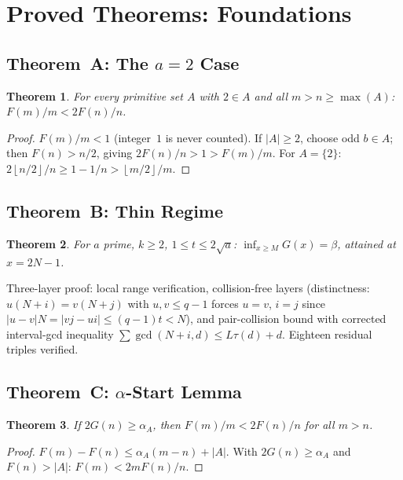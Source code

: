 \documentclass[11pt,a4paper]{article}
\newtheorem{theorem}{Theorem}[section]
\theoremstyle{definition}
\newcommand{\floor}[1]{\left\lfloor #1 \right\rfloor}
\begin{document}
\section{Proved Theorems: Foundations}

\subsection{Theorem~A: The $a=2$ Case}

\begin{theorem}\label{thm:a2}
For every primitive set $A$ with $2 \in A$ and all $m > n \geq \max(A)$:
$F(m)/m < 2F(n)/n$.
\end{theorem}

\begin{proof}
$F(m)/m < 1$ (integer~$1$ is never counted). If $|A| \geq 2$, choose
odd $b \in A$; then $F(n) > n/2$, giving $2F(n)/n > 1 > F(m)/m$.
For $A = \{2\}$: $2\floor{n/2}/n \geq 1 - 1/n > \floor{m/2}/m$.
\end{proof}

\subsection{Theorem~B: Thin Regime}

\begin{theorem}\label{thm:thin}
For $a$ prime, $k \geq 2$, $1 \leq t \leq 2\sqrt{a}$:
$\inf_{x \geq M} G(x) = \beta$, attained at $x = 2N-1$.
\end{theorem}

Three-layer proof: local range verification, collision-free layers
(distinctness: $u(N+i) = v(N+j)$ with $u,v \leq q-1$ forces $u=v$, $i=j$
since $|u-v|N = |vj-ui| \leq (q-1)t < N$), and pair-collision bound
with corrected interval-gcd inequality
$\sum \gcd(N+i, d) \leq L\tau(d) + d$. Eighteen residual triples verified.

\subsection{Theorem~C: $\alpha$-Start Lemma}

\begin{theorem}\label{thm:alpha}
If $2G(n) \geq \alpha_A$, then $F(m)/m < 2F(n)/n$ for all $m > n$.
\end{theorem}

\begin{proof}
$F(m) - F(n) \leq \alpha_A(m-n) + |A|$. With $2G(n) \geq \alpha_A$ and
$F(n) > |A|$: $F(m) < 2mF(n)/n$.
\end{proof}
\end{document}
